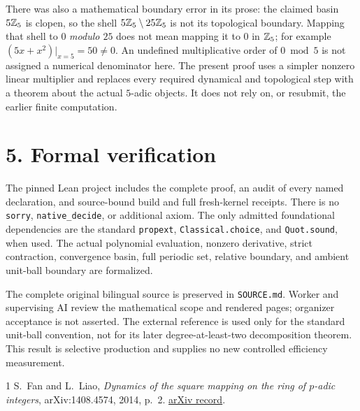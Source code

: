 \documentclass[10pt]{article}
\begin{document}
There was also a mathematical boundary error in its prose: the claimed basin $5\mathbb{Z}_5$ is clopen, so the shell $5\mathbb{Z}_5\setminus25\mathbb{Z}_5$ is not its topological boundary. Mapping that shell to $0$ \emph{modulo $25$} does not mean mapping it to $0$ in $\mathbb{Z}_5$; for example $(5x+x^2)|_{x=5}=50\ne0$. An undefined multiplicative order of $0\bmod5$ is not assigned a numerical denominator here. The present proof uses a simpler nonzero linear multiplier and replaces every required dynamical and topological step with a theorem about the actual $5$-adic objects. It does not rely on, or resubmit, the earlier finite computation.

\section*{5. Formal verification}
The pinned Lean project includes the complete proof, an audit of every named declaration, and source-bound build and full fresh-kernel receipts. There is no \texttt{sorry}, \texttt{native\_decide}, or additional axiom. The only admitted foundational dependencies are the standard \texttt{propext}, \texttt{Classical.choice}, and \texttt{Quot.sound}, when used. The actual polynomial evaluation, nonzero derivative, strict contraction, convergence basin, full periodic set, relative boundary, and ambient unit-ball boundary are formalized.

The complete original bilingual source is preserved in \texttt{SOURCE.md}. Worker and supervising AI review the mathematical scope and rendered pages; organizer acceptance is not asserted. The external reference is used only for the standard unit-ball convention, not for its later degree-at-least-two decomposition theorem. This result is selective production and supplies no new controlled efficiency measurement.

\begin{thebibliography}{1}
 S.~Fan and L.~Liao, \emph{Dynamics of the square mapping on the ring of $p$-adic integers}, arXiv:1408.4574, 2014, p.~2. \href{https://arxiv.org/abs/1408.4574}{arXiv record}.
\end{thebibliography}
\end{document}
